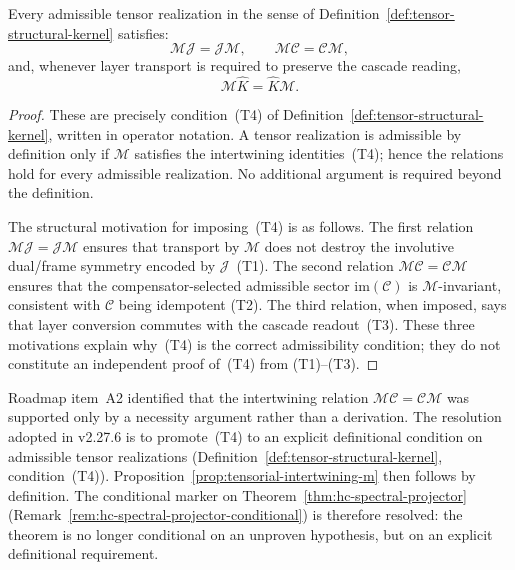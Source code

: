 \begin{proposition}
\label{prop:tensorial-intertwining-m}
Every admissible tensor realization in the sense of
Definition~\ref{def:tensor-structural-kernel} satisfies:
\[
\mathcal M\mathcal J=\mathcal J\mathcal M,
\qquad
\mathcal M\mathcal C=\mathcal C\mathcal M,
\]
and, whenever layer transport is required to preserve the cascade reading,
\[
\mathcal M\hat K=\hat K\mathcal M.
\]
\end{proposition}

\begin{proof}
These are precisely condition~(T4) of
Definition~\ref{def:tensor-structural-kernel}, written in operator
notation. A tensor realization is admissible by definition only if
$\mathcal M$ satisfies the intertwining identities~(T4); hence the
relations hold for every admissible realization. No additional argument
is required beyond the definition.

The structural motivation for imposing~(T4) is as follows. The first
relation $\mathcal M\mathcal J=\mathcal J\mathcal M$ ensures that
transport by $\mathcal M$ does not destroy the involutive dual/frame
symmetry encoded by $\mathcal J$~(T1). The second relation
$\mathcal M\mathcal C=\mathcal C\mathcal M$ ensures that the
compensator-selected admissible sector $\mathrm{im}(\mathcal C)$ is
$\mathcal M$-invariant, consistent with $\mathcal C$ being idempotent
(T2). The third relation, when imposed, says that layer conversion
commutes with the cascade readout~(T3). These three motivations
explain why~(T4) is the correct admissibility condition; they do not
constitute an independent proof of~(T4) from (T1)--(T3).
\end{proof}

\begin{remark}
\label{rem:a2-resolved}
Roadmap item~A2 identified that the intertwining relation
$\mathcal M\mathcal C=\mathcal C\mathcal M$ was supported only by a
necessity argument rather than a derivation. The resolution adopted
in v2.27.6 is to promote~(T4) to an explicit definitional condition
on admissible tensor realizations
(Definition~\ref{def:tensor-structural-kernel}, condition~(T4)).
Proposition~\ref{prop:tensorial-intertwining-m} then follows by
definition. The conditional marker on
Theorem~\ref{thm:hc-spectral-projector}
(Remark~\ref{rem:hc-spectral-projector-conditional}) is therefore
resolved: the theorem is no longer conditional on an unproven
hypothesis, but on an explicit definitional requirement.
\end{remark}

